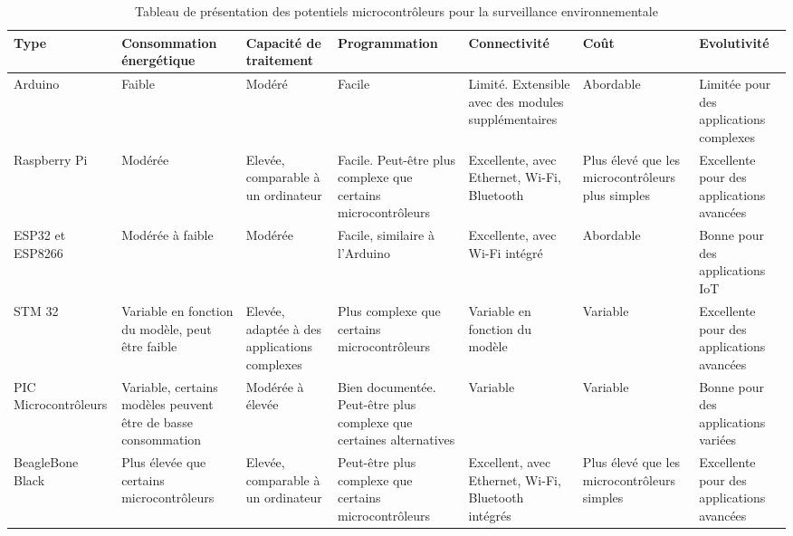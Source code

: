\begin{landscape}

	\begin{table}[H]
			\centering
		\caption{Tableau de présentation des potentiels microcontrôleurs pour la surveillance environnementale}
		\vspace{5mm}
		\begin{tabular}{|m{3cm}|m{3cm}|m{3cm}|m{3cm}|m{3cm}|m{3cm}|m{3cm}|}
		\hline
		\textbf{Type} & \textbf{Consommation énergétique} & \textbf{Capacité de traitement} & \textbf{Programmation} & \textbf{Connectivité} & \textbf{Coût} & \textbf{Evolutivité} \\
		\hline
		Arduino & Faible & Modéré & Facile & Limité. Extensible avec des modules supplémentaires & Abordable & Limitée pour des applications complexes \\
		\hline
		Raspberry Pi & Modérée & Elevée, comparable à un ordinateur & Facile. Peut-être plus complexe que certains microcontrôleurs & Excellente, avec Ethernet, Wi-Fi, Bluetooth & Plus élevé que les microcontrôleurs plus simples & Excellente pour des applications avancées \\
		\hline
		ESP32 et ESP8266 & Modérée à faible & Modérée & Facile, similaire à l’Arduino & Excellente, avec Wi-Fi intégré & Abordable & Bonne pour des applications IoT \\
		\hline
		STM 32 & Variable en fonction du modèle, peut être faible & Elevée, adaptée à des applications complexes & Plus complexe que certains microcontrôleurs & Variable en fonction du modèle & Variable & Excellente pour des applications avancées \\
		\hline
		PIC Microcontrôleurs & Variable, certains modèles peuvent être de basse consommation & Modérée à élevée & Bien documentée. Peut-être plus complexe que certaines alternatives & Variable & Variable & Bonne pour des applications variées \\
		\hline
		BeagleBone Black & Plus élevée que certains microcontrôleurs & Elevée, comparable à un ordinateur & Peut-être plus complexe que certains microcontrôleurs & Excellent, avec Ethernet, Wi-Fi, Bluetooth intégrés & Plus élevé que les microcontrôleurs simples & Excellente pour des applications avancées \\
		\hline
	\end{tabular}
	\end{table}
\end{landscape}

